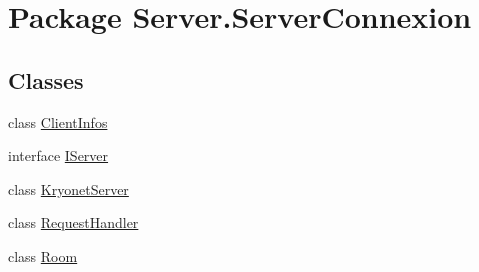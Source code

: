 \hypertarget{namespaceServer_1_1ServerConnexion}{}\section{Package Server.\+Server\+Connexion}
\label{namespaceServer_1_1ServerConnexion}
\subsection*{Classes}
\begin{DoxyCompactItemize}
\item 
class \mbox{\hyperlink{classServer_1_1ServerConnexion_1_1ClientInfos}{Client\+Infos}}
\item 
interface \mbox{\hyperlink{interfaceServer_1_1ServerConnexion_1_1IServer}{I\+Server}}
\item 
class \mbox{\hyperlink{classServer_1_1ServerConnexion_1_1KryonetServer}{Kryonet\+Server}}
\item 
class \mbox{\hyperlink{classServer_1_1ServerConnexion_1_1RequestHandler}{Request\+Handler}}
\item 
class \mbox{\hyperlink{classServer_1_1ServerConnexion_1_1Room}{Room}}
\end{DoxyCompactItemize}
